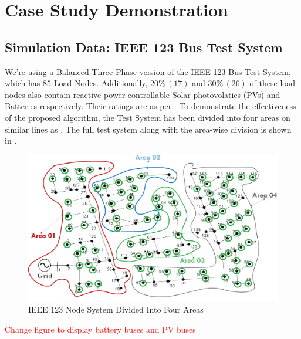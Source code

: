 \documentclass[../../outputs/main.tex]{subfiles}
\begin{document}
\section{Case Study Demonstration}

\subsection{Simulation Data: IEEE 123 Bus Test System}

We're using a Balanced Three-Phase version of the IEEE 123 Bus Test System, which has $85$ Load Nodes. Additionally, $20 \% \, (17)$ and $30 \% \, (26)$ of these load nodes also contain reactive power controllable Solar photovolatics (PVs) and Batteries respectively. Their ratings are as per . To demonstrate the effectiveness of the proposed algorithm, the Test System has been divided into four areas on similar lines as \cite{Sadnan}. The full test system along with the area-wise division is shown in .

\begin{figure}[h!]
    \centering
    \includegraphics[width=\linewidth]{../figures/ieee123-FourAreas.png}
    \caption{IEEE 123 Node System Divided Into Four Areas}
    \label{fig:ieee123-four-area-figure}
\end{figure}

\textcolor{red}{Change figure to display battery buses and PV buses}
\end{document}
